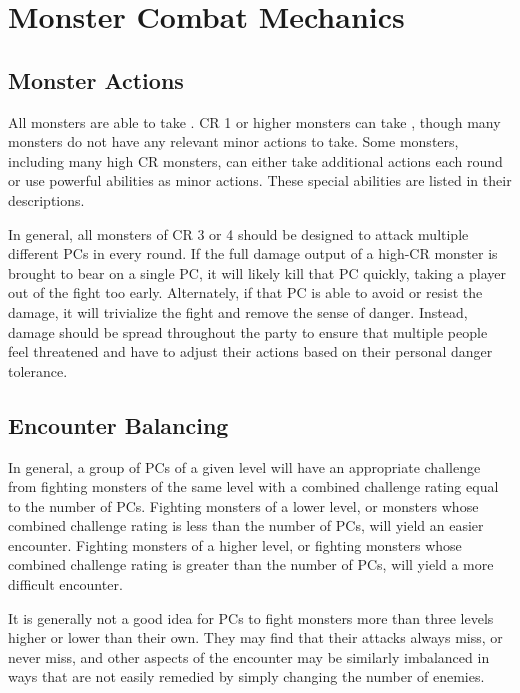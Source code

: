 \section{Monster Combat Mechanics}

    \subsection{Monster Actions}
        All monsters are able to take .
        CR 1 or higher monsters can take , though many monsters do not have any relevant minor actions to take.
        Some monsters, including many high CR monsters, can either take additional actions each round or use powerful abilities as minor actions.
        These special abilities are listed in their descriptions.

        In general, all monsters of CR 3 or 4 should be designed to attack multiple different PCs in every round.
        If the full damage output of a high-CR monster is brought to bear on a single PC, it will likely kill that PC quickly, taking a player out of the fight too early.
        Alternately, if that PC is able to avoid or resist the damage, it will trivialize the fight and remove the sense of danger.
        Instead, damage should be spread throughout the party to ensure that multiple people feel threatened and have to adjust their actions based on their personal danger tolerance.

    \subsection{Encounter Balancing}\label{Encounter Balancing}
        In general, a group of PCs of a given level will have an appropriate challenge from fighting monsters of the same level with a combined challenge rating equal to the number of PCs.
        Fighting monsters of a lower level, or monsters whose combined challenge rating is less than the number of PCs, will yield an easier encounter.
        Fighting monsters of a higher level, or fighting monsters whose combined challenge rating is greater than the number of PCs, will yield a more difficult encounter.

        It is generally not a good idea for PCs to fight monsters more than three levels higher or lower than their own.
        They may find that their attacks always miss, or never miss, and other aspects of the encounter may be similarly imbalanced in ways that are not easily remedied by simply changing the number of enemies.

